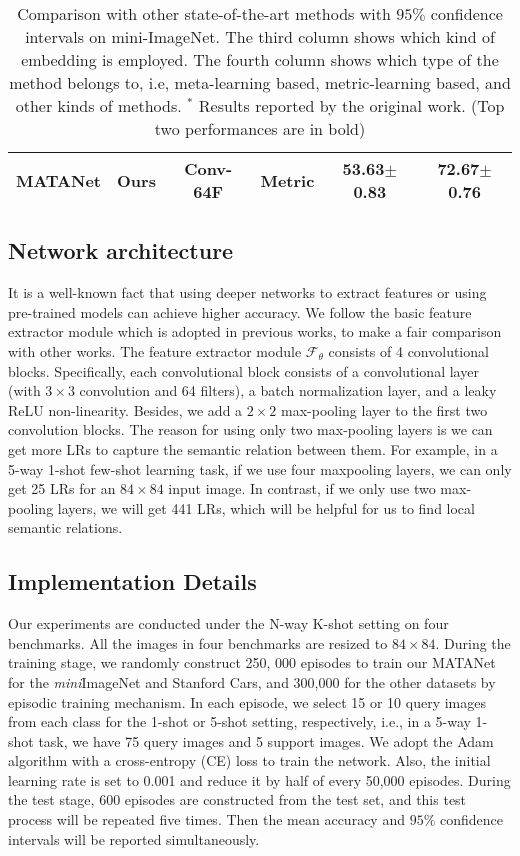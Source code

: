\documentclass[final]{cvpr}
\begin{document}
\begin{table*}[t]
\begin{tabular}{cccccc}
\midrule
			\textbf{MATANet} &Ours& Conv-64F & Metric &\textbf{53.63}$\pm$\textbf{\footnotesize{0.83}}  & \textbf{72.67}$\pm$\textbf{\footnotesize{0.76}} \\
			\bottomrule
		\end{tabular}
		\caption{Comparison with other state-of-the-art methods with $95\%$ confidence intervals on mini-ImageNet. The third column shows which kind of embedding is employed. The fourth column shows which type of the method belongs to, i.e, meta-learning based, metric-learning based, and other kinds of methods. $^*$ Results reported by the original work. (Top two performances are in bold) }
	\end{table*}
	
	
	
	\subsection{Network architecture}
	It is a well-known fact that using deeper networks to extract features or using pre-trained models can achieve higher accuracy. We follow the basic feature extractor module which is adopted in previous works, to make a fair comparison with other works. The feature extractor module $\mathcal{F}_{\theta}$ consists of 4 convolutional blocks. Specifically, each convolutional block consists of a convolutional layer (with $3\times3$ convolution and 64 filters), a batch normalization layer, and a leaky ReLU non-linearity. Besides, we add a $2\times2$ max-pooling layer to the first two convolution blocks. The reason for using only two max-pooling layers is we can get more LRs to capture the semantic relation between them. For example, in a 5-way 1-shot few-shot learning task, if we use four maxpooling layers, we can only get 25 LRs for an $84\times84$ input image. In contrast, if we only use two max-pooling layers, we will get 441 LRs, which will be helpful for us to find local semantic relations.
	
	\subsection{Implementation Details}
	Our experiments are conducted under the N-way K-shot setting on four benchmarks. All the images in four benchmarks are resized to $84\times84$. During the training stage, we randomly construct 250, 000 episodes to train our MATANet for the  \emph{mini}ImageNet and Stanford Cars, and 300,000 for the other datasets by episodic training mechanism. In each episode, we select 15 or 10 query images from each class for the 1-shot or 5-shot setting, respectively, i.e., in a 5-way 1-shot task, we have 75 query images and 5 support images. We adopt the Adam algorithm \cite{kingma2014adam} with a cross-entropy (CE) loss to train the network. Also, the initial learning rate is set to 0.001 and reduce it by half of every 50,000 episodes. During the test stage, 600 episodes are constructed from the test set,  and this test process will be repeated five times. Then the mean accuracy and $95\%$ confidence intervals will be reported simultaneously. 
	
\end{document}
